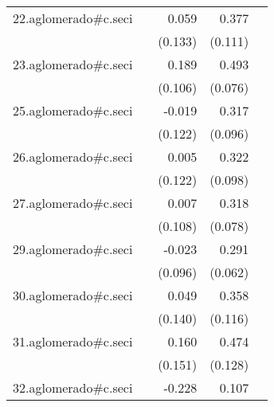 {\begin{longtable}{l*{4}{D{.}{.}{-1}}}
\addlinespace
22.aglomerado#c.seci&                     &       0.059         &       0.377\sym{***}&                     \\
            &                     &     (0.133)         &     (0.111)         &                     \\
\addlinespace
23.aglomerado#c.seci&                     &       0.189         &       0.493\sym{***}&                     \\
            &                     &     (0.106)         &     (0.076)         &                     \\
\addlinespace
25.aglomerado#c.seci&                     &      -0.019         &       0.317\sym{***}&                     \\
            &                     &     (0.122)         &     (0.096)         &                     \\
\addlinespace
26.aglomerado#c.seci&                     &       0.005         &       0.322\sym{***}&                     \\
            &                     &     (0.122)         &     (0.098)         &                     \\
\addlinespace
27.aglomerado#c.seci&                     &       0.007         &       0.318\sym{***}&                     \\
            &                     &     (0.108)         &     (0.078)         &                     \\
\addlinespace
29.aglomerado#c.seci&                     &      -0.023         &       0.291\sym{***}&                     \\
            &                     &     (0.096)         &     (0.062)         &                     \\
\addlinespace
30.aglomerado#c.seci&                     &       0.049         &       0.358\sym{**} &                     \\
            &                     &     (0.140)         &     (0.116)         &                     \\
\addlinespace
31.aglomerado#c.seci&                     &       0.160         &       0.474\sym{***}&                     \\
            &                     &     (0.151)         &     (0.128)         &                     \\
\addlinespace
32.aglomerado#c.seci&                     &      -0.228\sym{*}  &       0.107         &                     \\

\end{longtable}}
